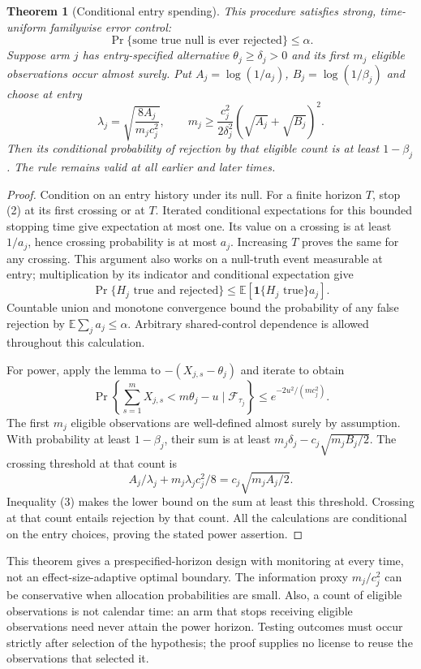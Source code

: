 \documentclass[11pt]{article}
\newtheorem{theorem}{Theorem}
\theoremstyle{remark}
\newcommand{\E}{\mathbb E}
\newcommand{\Ind}{\mathbf 1}
\begin{document}
\begin{theorem}[Conditional entry spending]
This procedure satisfies strong, time-uniform familywise error control:
\[
 \Pr\{\text{some true null is ever rejected}\}\leq\alpha.
\]
Suppose arm $j$ has entry-specified alternative $\theta_j\geq\delta_j>0$
and its first $m_j$ eligible observations occur almost surely. Put
$A_j=\log(1/a_j)$, $B_j=\log(1/\beta_j)$ and choose at entry
\[
 \lambda_j=\sqrt{\frac{8A_j}{m_jc_j^2}},\qquad
 m_j\geq\frac{c_j^2}{2\delta_j^2}
                 (\sqrt{A_j}+\sqrt{B_j})^2. \tag{3}
\]
Then its conditional probability of rejection by that eligible count is
at least $1-\beta_j$. The rule remains valid at all earlier and later times.
\end{theorem}
\begin{proof}
Condition on an entry history under its null. For a finite horizon $T$,
stop (2) at its first crossing or at $T$. Iterated conditional expectations
for this bounded stopping time give expectation at most one. Its value
on a crossing is at least $1/a_j$, hence crossing probability is at most
$a_j$. Increasing $T$ proves the same for any crossing. This argument
also works on a null-truth event measurable at entry; multiplication by
its indicator and conditional expectation give
\[
 \Pr\{H_j\text{ true and rejected}\}
 \leq\E[\Ind\{H_j\text{ true}\}a_j].
\]
Countable union and monotone convergence bound the probability of any
false rejection by $\E\sum_j a_j\leq\alpha$. Arbitrary shared-control
dependence is allowed throughout this calculation.

For power, apply the lemma to $-(X_{j,s}-\theta_j)$ and iterate to obtain
\[
 \Pr\left\{\sum_{s=1}^mX_{j,s}<m\theta_j-u
          \mid\mathcal F_{\tau_j}\right\}
 \leq e^{-2u^2/(mc_j^2)}.
\]
The first $m_j$ eligible observations are well-defined almost surely by
assumption. With probability at least $1-\beta_j$, their sum is at least
$m_j\delta_j-c_j\sqrt{m_jB_j/2}$. The crossing threshold at that count is
\[
 A_j/\lambda_j+m_j\lambda_jc_j^2/8
     =c_j\sqrt{m_jA_j/2}.
\]
Inequality (3) makes the lower bound on the sum at least this threshold.
Crossing at that count entails rejection by that count. All the calculations
are conditional on the entry choices, proving the stated power assertion.
\end{proof}

This theorem gives a prespecified-horizon design with monitoring at every
time, not an effect-size-adaptive optimal boundary. The information proxy
$m_j/c_j^2$ can be conservative when allocation probabilities are small.
Also, a count of eligible observations is not calendar time: an arm that
stops receiving eligible observations need never attain the power horizon.
Testing outcomes must occur strictly after selection of the hypothesis;
the proof supplies no license to reuse the observations that selected it.
\end{document}
